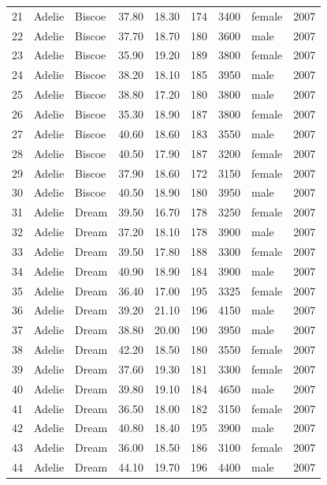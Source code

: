 \documentclass{article}\usepackage[]{graphicx}\usepackage[]{xcolor}
\begin{document}
\begin{table}[ht]
\begin{tabular}{rllrrrrlr}
  21 & Adelie & Biscoe & 37.80 & 18.30 & 174 & 3400 & female & 2007 \\ 
  22 & Adelie & Biscoe & 37.70 & 18.70 & 180 & 3600 & male & 2007 \\ 
  23 & Adelie & Biscoe & 35.90 & 19.20 & 189 & 3800 & female & 2007 \\ 
  24 & Adelie & Biscoe & 38.20 & 18.10 & 185 & 3950 & male & 2007 \\ 
  25 & Adelie & Biscoe & 38.80 & 17.20 & 180 & 3800 & male & 2007 \\ 
  26 & Adelie & Biscoe & 35.30 & 18.90 & 187 & 3800 & female & 2007 \\ 
  27 & Adelie & Biscoe & 40.60 & 18.60 & 183 & 3550 & male & 2007 \\ 
  28 & Adelie & Biscoe & 40.50 & 17.90 & 187 & 3200 & female & 2007 \\ 
  29 & Adelie & Biscoe & 37.90 & 18.60 & 172 & 3150 & female & 2007 \\ 
  30 & Adelie & Biscoe & 40.50 & 18.90 & 180 & 3950 & male & 2007 \\ 
  31 & Adelie & Dream & 39.50 & 16.70 & 178 & 3250 & female & 2007 \\ 
  32 & Adelie & Dream & 37.20 & 18.10 & 178 & 3900 & male & 2007 \\ 
  33 & Adelie & Dream & 39.50 & 17.80 & 188 & 3300 & female & 2007 \\ 
  34 & Adelie & Dream & 40.90 & 18.90 & 184 & 3900 & male & 2007 \\ 
  35 & Adelie & Dream & 36.40 & 17.00 & 195 & 3325 & female & 2007 \\ 
  36 & Adelie & Dream & 39.20 & 21.10 & 196 & 4150 & male & 2007 \\ 
  37 & Adelie & Dream & 38.80 & 20.00 & 190 & 3950 & male & 2007 \\ 
  38 & Adelie & Dream & 42.20 & 18.50 & 180 & 3550 & female & 2007 \\ 
  39 & Adelie & Dream & 37.60 & 19.30 & 181 & 3300 & female & 2007 \\ 
  40 & Adelie & Dream & 39.80 & 19.10 & 184 & 4650 & male & 2007 \\ 
  41 & Adelie & Dream & 36.50 & 18.00 & 182 & 3150 & female & 2007 \\ 
  42 & Adelie & Dream & 40.80 & 18.40 & 195 & 3900 & male & 2007 \\ 
  43 & Adelie & Dream & 36.00 & 18.50 & 186 & 3100 & female & 2007 \\ 
  44 & Adelie & Dream & 44.10 & 19.70 & 196 & 4400 & male & 2007 \\ 

\end{tabular}
\end{table}
\end{document}
